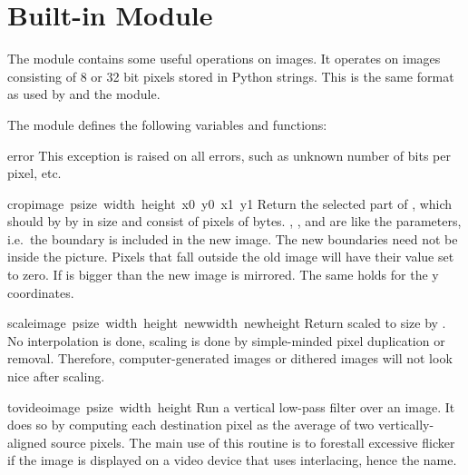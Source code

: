 \section{Built-in Module }

The  module contains some useful operations on images.
It operates on images consisting of 8 or 32 bit pixels
stored in Python strings.  This is the same format as used
by  and the  module.

The module defines the following variables and functions:

\renewcommand{\indexsubitem}{(in module imageop)}

\begin{excdesc}{error}
This exception is raised on all errors, such as unknown number of bits
per pixel, etc.
\end{excdesc}


\begin{funcdesc}{crop}{image\, psize\, width\, height\, x0\, y0\, x1\, y1}
Return the selected part of , which should by
 by  in size and consist of pixels of
 bytes. , ,  and  are like
the  parameters, i.e.\ the boundary is included in the
new image.  The new boundaries need not be inside the picture.  Pixels
that fall outside the old image will have their value set to zero.  If
 is bigger than  the new image is mirrored.  The same
holds for the y coordinates.
\end{funcdesc}

\begin{funcdesc}{scale}{image\, psize\, width\, height\, newwidth\, newheight}
Return  scaled to size  by .
No interpolation is done, scaling is done by simple-minded pixel
duplication or removal.  Therefore, computer-generated images or
dithered images will not look nice after scaling.
\end{funcdesc}

\begin{funcdesc}{tovideo}{image\, psize\, width\, height}
Run a vertical low-pass filter over an image.  It does so by computing
each destination pixel as the average of two vertically-aligned source
pixels.  The main use of this routine is to forestall excessive
flicker if the image is displayed on a video device that uses
interlacing, hence the name.
\end{funcdesc}

